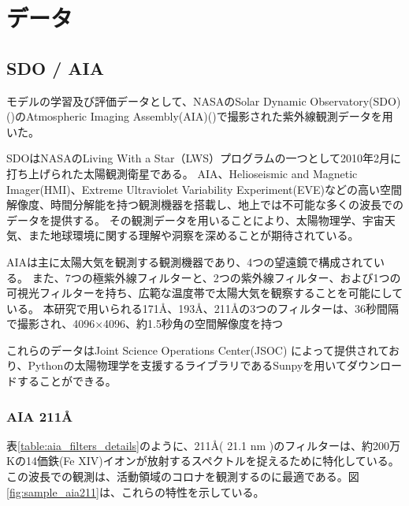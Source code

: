 \chapter{データ} 

\section{SDO / AIA}
モデルの学習及び評価データとして、NASAのSolar Dynamic Observatory(SDO)(\cite{pesnell2012solar})のAtmospheric Imaging Assembly(AIA)(\cite{lemen2012atmospheric})で撮影された紫外線観測データを用いた。

SDOはNASAのLiving With a Star（LWS）プログラムの一つとして2010年2月に打ち上げられた太陽観測衛星である。
AIA、Helioseismic and Magnetic Imager(HMI)、Extreme Ultraviolet Variability Experiment(EVE)などの高い空間解像度、時間分解能を持つ観測機器を搭載し、地上では不可能な多くの波長でのデータを提供する。
その観測データを用いることにより、太陽物理学、宇宙天気、また地球環境に関する理解や洞察を深めることが期待されている。

AIAは主に太陽大気を観測する観測機器であり、4つの望遠鏡で構成されている。
また、7つの極紫外線フィルターと、2つの紫外線フィルター、および1つの可視光フィルターを持ち、広範な温度帯で太陽大気を観察することを可能にしている。
本研究で用いられる171Å、193Å、211Åの3つのフィルターは、36秒間隔で撮影され、4096×4096、約1.5秒角の空間解像度を持つ

これらのデータはJoint Science Operations Center(JSOC) によって提供されており、Pythonの太陽物理学を支援するライブラリであるSunpyを用いてダウンロードすることができる。


\subsection{AIA 211Å}
    表\ref{table:aia_filters_details}のように、211Å( 21.1 nm )のフィルターは、約200万Kの14価鉄(Fe XIV)イオンが放射するスペクトルを捉えるために特化している。
    この波長での観測は、活動領域のコロナを観測するのに最適である。図\ref{fig:sample_aia211}は、これらの特性を示している。

